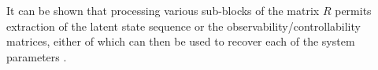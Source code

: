 It can be shown that processing various sub-blocks of the matrix $R$ permits extraction of the latent state sequence or the observability/controllability matrices, either of which can then be used to recover each of the system parameters \cite{ho_editorial_1966, van_overschee_n4sid_1994, van_overschee_subspace_1996, qin_overview_2006}. 